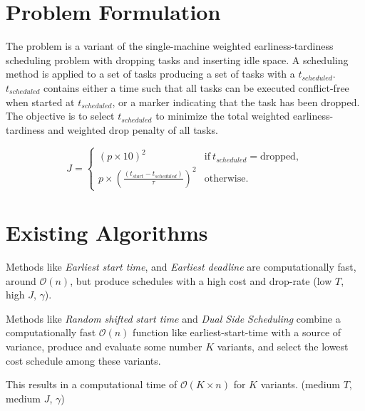 \documentclass[conference]{IEEEtran}
\begin{document}
\section{Problem Formulation}

The problem is a variant of the single-machine weighted earliness-tardiness scheduling problem with dropping tasks and inserting idle space.
A scheduling method is applied to a set of tasks producing a set of tasks with a $t_{scheduled}$.
$t_{scheduled}$ contains either a time such that all tasks can be executed conflict-free when started at $t_{scheduled}$, or a marker indicating that the task has been dropped.
The objective is to select $t_{scheduled}$ to minimize the total weighted earliness-tardiness and weighted drop penalty of all tasks.

\begin{equation}
	J = \begin{cases}
		(p \times 10)^2                                       & \mathrm{if}~t_{scheduled} = \mathrm{dropped,} \\
		p \times (\frac{(t_{start} - t_{scheduled})}{\tau})^2 & \mathrm{otherwise.}
	\end{cases}
\end{equation}

\section{Existing Algorithms}

Methods like \emph{Earliest start time}, and \emph{Earliest deadline} are computationally fast, around $\mathcal{O}(n)$, but produce schedules with a high cost and drop-rate (low $T$, high $J$, $\gamma$).

Methods like \emph{Random shifted start time} and \emph{Dual Side Scheduling} combine a computationally fast
$\mathcal{O}(n)$ function like earliest-start-time with a source of variance, produce and evaluate some number $K$ variants, and select the lowest cost schedule among these variants.

This results in a computational time of $\mathcal{O}(K \times n)$ for $K$ variants. (medium $T$, medium $J$, $\gamma$)
\end{document}
